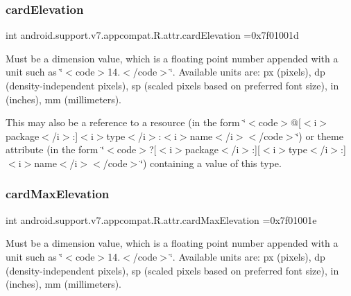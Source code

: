 \subsubsection{\texorpdfstring{card\+Elevation}{cardElevation}}
{\footnotesize\ttfamily int android.\+support.\+v7.\+appcompat.\+R.\+attr.\+card\+Elevation =0x7f01001d\hspace{0.3cm}{\ttfamily [static]}}

Must be a dimension value, which is a floating point number appended with a unit such as \char`\"{}$<$code$>$14.\+5sp$<$/code$>$\char`\"{}. Available units are\+: px (pixels), dp (density-\/independent pixels), sp (scaled pixels based on preferred font size), in (inches), mm (millimeters). 

This may also be a reference to a resource (in the form \char`\"{}$<$code$>$@\mbox{[}$<$i$>$package$<$/i$>$\+:\mbox{]}$<$i$>$type$<$/i$>$\+:$<$i$>$name$<$/i$>$$<$/code$>$\char`\"{}) or theme attribute (in the form \char`\"{}$<$code$>$?\mbox{[}$<$i$>$package$<$/i$>$\+:\mbox{]}\mbox{[}$<$i$>$type$<$/i$>$\+:\mbox{]}$<$i$>$name$<$/i$>$$<$/code$>$\char`\"{}) containing a value of this type. \mbox{\label{classandroid_1_1support_1_1v7_1_1appcompat_1_1R_1_1attr_ad913746d1d0e1d87003d6eac9574961c}} 
\subsubsection{\texorpdfstring{card\+Max\+Elevation}{cardMaxElevation}}
{\footnotesize\ttfamily int android.\+support.\+v7.\+appcompat.\+R.\+attr.\+card\+Max\+Elevation =0x7f01001e\hspace{0.3cm}{\ttfamily [static]}}

Must be a dimension value, which is a floating point number appended with a unit such as \char`\"{}$<$code$>$14.\+5sp$<$/code$>$\char`\"{}. Available units are\+: px (pixels), dp (density-\/independent pixels), sp (scaled pixels based on preferred font size), in (inches), mm (millimeters). 

